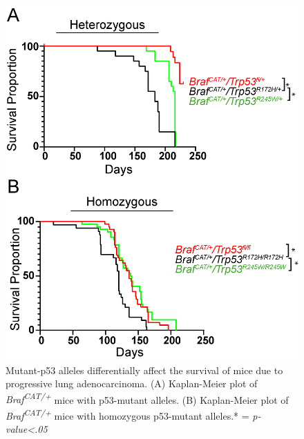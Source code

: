 \begin{figure}
\hypertarget{fig:3.4}{%
\centering
\includegraphics[width=1\textwidth,height=\textheight]{images/p53_3.png}
\caption{Mutant-p53 alleles differentially affect the survival of mice due to progressive lung adenocarcinoma. (A) Kaplan-Meier plot of \emph{Braf\textsuperscript{CAT/+}} mice with p53-mutant alleles. (B) Kaplan-Meier plot of \emph{Braf\textsuperscript{CAT/+}} mice with homozygous p53-mutant alleles.* = \emph{p-value\textless.05}}\label{fig:3.4}
}
\end{figure}

